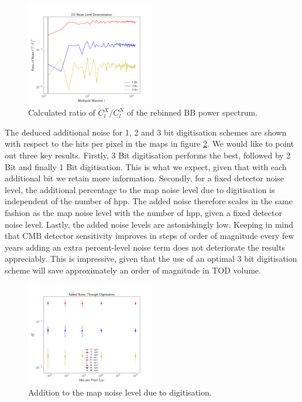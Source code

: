\documentclass[apj]{emulateapj}
\begin{document}
\begin{figure}[htb]\centering
\includegraphics[width=0.5\textwidth,clip]{Plots/bbratio.png}
  \caption[Current ]{
  Calculated ratio of $C_l^X/C_l^N$ of the rebinned $\mathrm{BB}$ power spectrum.
\label{fig:clxclnbb}
}
\end{figure}


The deduced additional noise for 1, 2 and 3 bit digitisation schemes are shown with respect to the hits per pixel in the maps in figure \ref{fig:extranoise}. We would like to point out three key results. Firstly, 3 Bit digitisation performs the best, followed by 2 Bit and finally 1 Bit digitisation. This is what we expect, given that with each additional bit we retain more information. Secondly, for a fixed detector noise level, the additional percentage to the map noise level due to digitisation is independent of the number of hpp. The added noise therefore scales in the same fashion as the map noise level with the number of hpp, given a fixed detector noise level. Lastly, the added noise levels are astonishingly low. Keeping in mind that CMB detector sensitivity improves in steps of order of magnitude every few years adding an extra percent-level noise term does not deteriorate the results appreciably. This is impressive, given that the use of an optimal 3 bit digitisation scheme will save approximately an order of magnitude in TOD volume.

\begin{figure}[htb]\centering
\includegraphics[width=0.5\textwidth,clip]{Plots/addednoise.png}
  \caption[Current ]{
  Addition to the map noise level due to digitisation. 
           \label{fig:extranoise}
  }
\end{figure}
\end{document}

